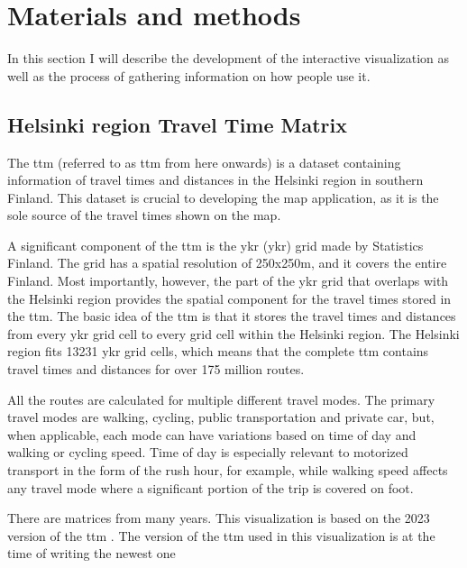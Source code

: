 \section{Materials and methods}
In this section I will describe the development of the interactive visualization
as well as the process of gathering information on how people use it.

\subsection{Helsinki region Travel Time Matrix}

The \acrlong{ttm} (referred to as \acrshort{ttm} from here onwards)
is a dataset containing information of travel times and distances
in the Helsinki region in southern Finland.
This dataset is crucial to developing the map application,
as it is the sole source of the travel times shown on the map.

A significant component of the \acrshort{ttm} is the \acrlong{ykr} (\acrshort{ykr}) grid
made by Statistics Finland.
The grid has a spatial resolution of 250x250m, and it covers the entire Finland.
Most importantly, however, the part of the \acrshort{ykr} grid that overlaps with
the Helsinki region provides the spatial component for
the travel times stored in the \acrshort{ttm}.
The basic idea of the \acrshort{ttm} is that it stores the travel times and distances
from every \acrshort{ykr} grid cell to every grid cell within the Helsinki region.
The Helsinki region fits 13231 \acrshort{ykr} grid cells,
which means that the complete \acrshort{ttm} contains travel times and distances for
over 175 million routes.

All the routes are calculated for multiple different travel modes.
The primary travel modes are walking, cycling, public transportation and private car,
but, when applicable, each mode can have variations based on
time of day and walking or cycling speed.
Time of day is especially relevant to motorized transport
in the form of the rush hour, for example,
while walking speed affects any travel mode
where a significant portion of the trip is covered on foot.

There are matrices from many years.
This visualization is based on the 2023 version of the \acrshort{ttm}
\parencite{fin2023}.
The version of the \acrshort{ttm} used in this visualization is at the time of writing the newest one

